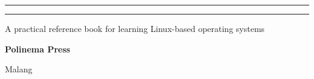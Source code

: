 \begin{titlepage}
    \vfill

    \begin{minipage}{1\textwidth}
        \centering
        \rule{0.28\textwidth}{0.6pt}\hspace{0.03\textwidth}\rule{0.28\textwidth}{0.6pt}\par
        \vspace{0.35cm}
        {\small\sffamily A practical reference book for learning Linux-based operating systems\par}
        \vspace{0.75cm}
        {\normalsize\bfseries Polinema Press\par}
        {\normalsize Malang \textbullet{} \the\year\par}
    \end{minipage}

\end{titlepage}

\cleardoublepage
